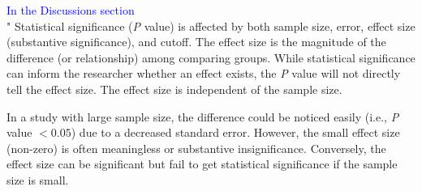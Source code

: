 \documentclass[preprint,12pt]{elsarticle}
\newenvironment{MyIndent}
{\par\leftskip1cm\relax\rightskip1cm\relax}
{\par\leftskip0cm\relax\rightskip0cm\relax}
\newenvironment{MyColorPar}[1]{%
    \leavevmode\color{#1}\ignorespaces%
}{%
}%
\begin{document}
\begin{MyColorPar}{blue}
\begin{MyIndent}
\begin{MyColorPar}{red}
\textcolor{blue}{In the Discussions section}\\
"  %
Statistical significance (\textit{P} value) is affected by both sample size, error, effect size (substantive significance)\cite{Sullivan2012}\cite{Thiese2016}, and cutoff. 
The effect size is the magnitude of the difference (or relationship) among comparing groups.
While statistical significance can inform the researcher whether an effect exists, 
the \textit{P} value will not directly tell the effect size.
The effect size is independent of the sample size\cite{Sullivan2012}.


In a study with large sample size, the difference could be noticed easily (i.e., \textit{P} value $< 0.05$) due to a decreased standard error\cite{Sullivan2012}.
However, the small effect size (non-zero) is often meaningless or substantive insignificance.
Conversely, the effect size can be significant but fail to get statistical significance if the sample size is small. 


\end{MyColorPar}
\end{MyIndent}
\end{MyColorPar}
\end{document}
